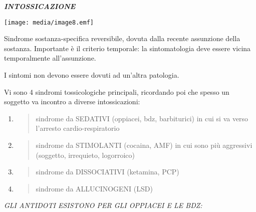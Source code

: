 \documentclass[]{article}
\begin{document}
\textbf{\emph{INTOSSICAZIONE}}

\texttt{[image: media/image8.emf]}

Sindrome sostanza-specifica reversibile, dovuta dalla recente assunzione
della sostanza. Importante è il criterio temporale: la sintomatologia
deve essere vicina temporalmente all'assunzione.

I sintomi non devono essere dovuti ad un'altra patologia.

Vi sono 4 sindromi tossicologiche principali, ricordando poi che spesso
un soggetto va incontro a diverse intossicazioni:

\begin{enumerate}
\def\labelenumi{\arabic{enumi}.}
\item
  \begin{quote}
  sindrome da SEDATIVI (oppiacei, bdz, barbiturici) in cui si va verso
  l'arresto cardio-respiratorio
  \end{quote}
\item
  \begin{quote}
  sindrome da STIMOLANTI (cocaina, AMF) in cui sono più aggressivi
  (soggetto, irrequieto, logorroico)
  \end{quote}
\item
  \begin{quote}
  sindrome da DISSOCIATIVI (ketamina, PCP)
  \end{quote}
\item
  \begin{quote}
  sindrome da ALLUCINOGENI (LSD)
  \end{quote}
\end{enumerate}

\emph{GLI ANTIDOTI ESISTONO PER GLI OPPIACEI E LE BDZ:}
\end{document}
